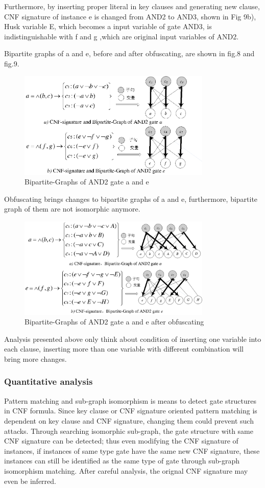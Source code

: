 \documentclass[runningheads,a4paper]{llncs}
\begin{document}
Furthermore, by inserting proper literal in key clauses and generating new clause, CNF signature of instance e is changed from AND2 to AND3, shown in Fig 9b), Husk variable E, which becomes a input variable of gate AND3, is indistinguishable with f and g ,which are original input variables of AND2.

Bipartite graphs of a and e, before and after obfuscating, are shown in fig.8 and fig.9.
\begin{figure}
\centering
\includegraphics[width=9.2cm]{a8}
\caption{Bipartite-Graphs of AND2 gate a and e}
\end{figure}

Obfuscating brings changes to bipartite graphs of a and e, furthermore, bipartite graph of them are not isomorphic anymore.
\begin{figure}
\centering
\includegraphics[width=9.2cm]{a9}
\caption{Bipartite-Graphs of AND2 gate a and e after obfuscating}
\end{figure}
Analysis presented above only think about condition of inserting one variable into each clause, inserting more than one variable with different combination will bring more changes. 

\subsubsection{Quantitative analysis} 

Pattern matching and sub-graph isomorphism is means to detect gate structures in CNF formula. Since key clause or CNF signature oriented pattern matching is dependent on key clause and CNF signature, changing them could prevent such attacks. Through searching isomorphic sub-graph, the gate structure with same CNF signature can be detected; thus even modifying the CNF signature of instances, if instances of same type gate have the same new CNF signature, these instances can still be identified as the same type of gate through sub-graph isomorphism matching. After careful analysis, the orignal CNF signature may even be inferred. 
\end{document}
